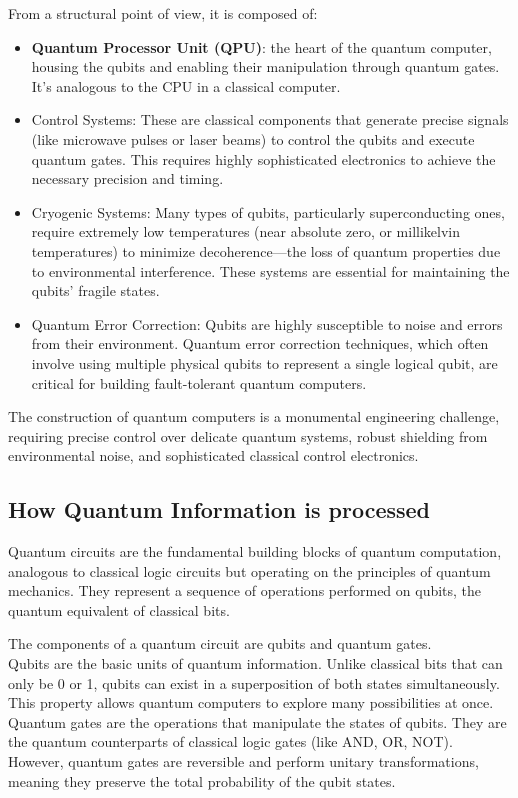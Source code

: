 \documentclass{article}
\begin{document}
From a structural point of view, it is composed of:
\begin{itemize}

\item \textbf{Quantum Processor Unit (QPU)}: the heart of the quantum computer, housing the qubits and enabling their manipulation through quantum gates. It's analogous to the CPU in a classical computer.

\item Control Systems: These are classical components that generate precise signals (like microwave pulses or laser beams) to control the qubits and execute quantum gates. This requires highly sophisticated electronics to achieve the necessary precision and timing.

\item Cryogenic Systems: Many types of qubits, particularly superconducting ones, require extremely low temperatures (near absolute zero, or millikelvin temperatures) to minimize decoherence—the loss of quantum properties due to environmental interference. These systems are essential for maintaining the qubits' fragile states.

\item Quantum Error Correction: Qubits are highly susceptible to noise and errors from their environment. Quantum error correction techniques, which often involve using multiple physical qubits to represent a single logical qubit, are critical for building fault-tolerant quantum computers.
\end{itemize}
The construction of quantum computers is a monumental engineering challenge, requiring precise control over delicate quantum systems, robust shielding from environmental noise, and sophisticated classical control electronics.
\newpage
\subsection{How Quantum Information is processed}
Quantum circuits are the fundamental building blocks of quantum computation, analogous to classical logic circuits but operating on the principles of quantum mechanics. They represent a sequence of operations performed on qubits, the quantum equivalent of classical bits.

The components of a quantum circuit are qubits and quantum gates.\\Qubits are the basic units of quantum information. Unlike classical bits that can only be 0 or 1, qubits can exist in a superposition of both states simultaneously. This property allows quantum computers to explore many possibilities at once.\\Quantum gates are the operations that manipulate the states of qubits. They are the quantum counterparts of classical logic gates (like AND, OR, NOT). However, quantum gates are reversible and perform unitary transformations, meaning they preserve the total probability of the qubit states.
\end{document}
